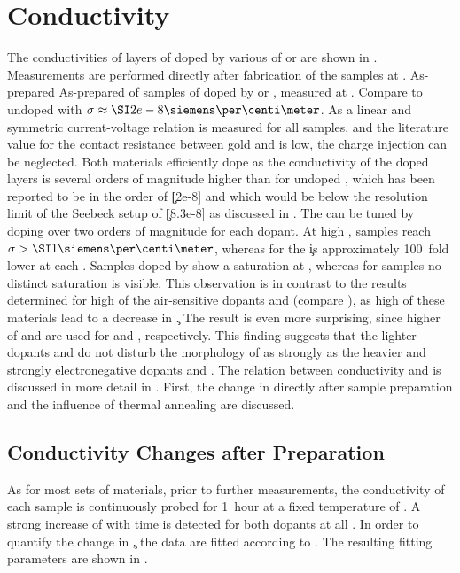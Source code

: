 \section{Conductivity}\label{sec:ResASCond}
The conductivities of layers of \CS doped by various \CLongs of \aob or \dmbi are shown in . Measurements are performed directly after fabrication of the samples at \T[25].
%
{As-prepared \cLong \vs \CLong}
{As-prepared \cLongL \vs \CLongL of samples of \CS doped by \aob or \dmbi, measured at \T[25]. Compare to undoped \CS with \mbox{$\c\approx\Scm{2e-8}$}\cite{Li2006}.}
%
As a linear and symmetric current-voltage relation is measured for all samples, and the literature value for the contact resistance between gold and \CS is low\cite{Kitamura2011}, the charge injection can be neglected.
Both materials efficiently dope \CS as the conductivity of the doped layers is several orders of magnitude higher than for undoped \CS, which has been reported to be in the order of \c[2e-8]\cite{Li2006} and which would be below the resolution limit of the Seebeck setup of \c[8.3e-8] as discussed in .
The \cLong can be tuned by doping over two orders of magnitude for each dopant.
At high \C, \dmbi samples reach $\c>\Scm{1}$, whereas for \aob the \c is approximately 100~fold lower at each \C.
Samples doped by \dmbi show a saturation at , whereas for \aob samples no distinct saturation is visible.
This observation is in contrast to the results determined for high \CLongs of the air-sensitive dopants \CrPd and \WPd (compare ), as high \C of these materials lead to a decrease in \c.
The result is even more surprising, since higher \CLong of \C[0.650] and \C[0.510] are used for \dmbi and \aob, respectively.
%
This finding suggests that the lighter dopants \aob and \dmbi do not disturb the morphology of \CS as strongly as the heavier and strongly electronegative dopants \CrPd and \WPd. The relation between conductivity and \CLong is discussed in more detail in . First, the change in \cLong directly after sample preparation and the influence of thermal annealing are discussed.

\subsection{Conductivity Changes after Preparation}
As for most sets of materials, prior to further measurements, the conductivity of each sample is continuously probed for 1~hour at a fixed temperature of \T[25]. A strong increase of \cLong with time is detected for both dopants at all \CLongs. In order to quantify the change in \c, the data are fitted according to . The resulting fitting parameters are shown in .

